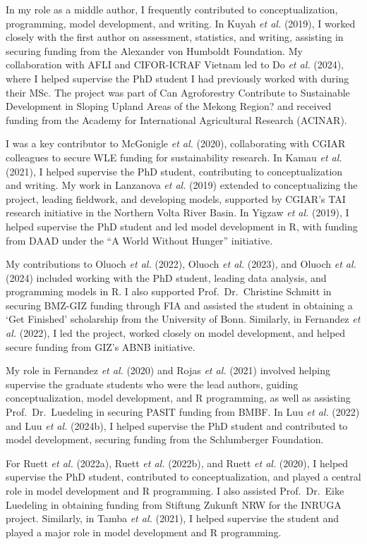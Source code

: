 \documentclass[
]{article}
\begin{document}
In my role as a middle author, I frequently contributed to
conceptualization, programming, model development, and writing. In Kuyah
\emph{et al.} (2019), I worked closely with the first author on
assessment, statistics, and writing, assisting in securing funding from
the Alexander von Humboldt Foundation. My collaboration with AFLI and
CIFOR-ICRAF Vietnam led to Do \emph{et al.} (2024), where I helped
supervise the PhD student I had previously worked with during their MSc.
The project was part of Can Agroforestry Contribute to Sustainable
Development in Sloping Upland Areas of the Mekong Region? and received
funding from the Academy for International Agricultural Research
(ACINAR).

I was a key contributor to McGonigle \emph{et al.} (2020), collaborating
with CGIAR colleagues to secure WLE funding for sustainability research.
In Kamau \emph{et al.} (2021), I helped supervise the PhD student,
contributing to conceptualization and writing. My work in Lanzanova
\emph{et al.} (2019) extended to conceptualizing the project, leading
fieldwork, and developing models, supported by CGIAR's TAI research
initiative in the Northern Volta River Basin. In Yigzaw \emph{et al.}
(2019), I helped supervise the PhD student and led model development in
R, with funding from DAAD under the ``A World Without Hunger''
initiative.

My contributions to Oluoch \emph{et al.} (2022), Oluoch \emph{et al.}
(2023), and Oluoch \emph{et al.} (2024) included working with the PhD
student, leading data analysis, and programming models in R. I also
supported Prof.~Dr.~Christine Schmitt in securing BMZ-GIZ funding
through FIA and assisted the student in obtaining a `Get Finished'
scholarship from the University of Bonn. Similarly, in Fernandez
\emph{et al.} (2022), I led the project, worked closely on model
development, and helped secure funding from GIZ's ABNB initiative.

My role in Fernandez \emph{et al.} (2020) and Rojas \emph{et al.} (2021)
involved helping supervise the graduate students who were the lead
authors, guiding conceptualization, model development, and R
programming, as well as assisting Prof.~Dr.~Luedeling in securing PASIT
funding from BMBF. In Luu \emph{et al.} (2022) and Luu \emph{et al.}
(2024b), I helped supervise the PhD student and contributed to model
development, securing funding from the Schlumberger Foundation.

For Ruett \emph{et al.} (2022a), Ruett \emph{et al.} (2022b), and Ruett
\emph{et al.} (2020), I helped supervise the PhD student, contributed to
conceptualization, and played a central role in model development and R
programming. I also assisted Prof.~Dr.~Eike Luedeling in obtaining
funding from Stiftung Zukunft NRW for the INRUGA project. Similarly, in
Tamba \emph{et al.} (2021), I helped supervise the student and played a
major role in model development and R programming.
\end{document}
